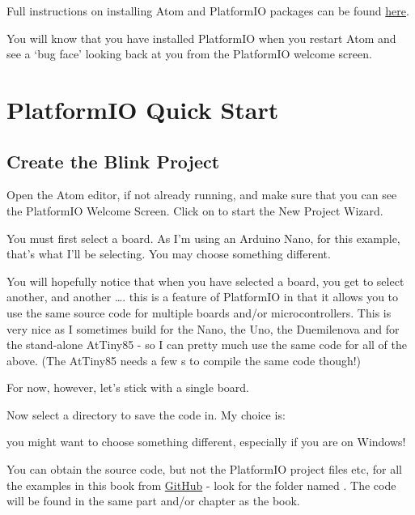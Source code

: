 Full instructions on installing Atom and PlatformIO packages can be
found
\href{http://docs.platformio.org/en/latest/ide/atom.html\#clang-for-intelligent-code-completion}{here}.

You will know that you have installed PlatformIO when you restart Atom
and see a `bug face' looking back at you from the PlatformIO welcome
screen.

\section{PlatformIO Quick Start}\label{platformio-quick-start}

\subsection{Create the Blink Project}\label{create-the-blink-project}

Open the Atom editor, if not already running, and make sure that you can
see the PlatformIO Welcome Screen. Click on  to start the
New Project Wizard.

You must first select a board. As I'm using an Arduino Nano, for this
example, that's what I'll be selecting. You may choose something
different.

You will hopefully notice that when you have selected a board, you get
to select another, and another \ldots{}. this is a feature of PlatformIO
in that it allows you to use the same source code for multiple boards
and/or microcontrollers. This is very nice as I sometimes build for the Nano, the Uno,
the Duemilenova and for the stand-alone AtTiny85 - so I can pretty much use the same code
for all of the above. (The AtTiny85 needs a few s to compile the same code though!)

For now, however, let's stick with a single board.

Now select a directory to save the code in. My choice is:


you might want to choose something different, especially if you are on
Windows!

\begin{note}
You can obtain the source code, but not the PlatformIO project files etc, for all the examples in this book from \href{https://github.com/NormanDunbar/AVRBook}{GitHub} - look for the folder named . The code will be found in the same part and/or chapter as the book.
\end{note}

